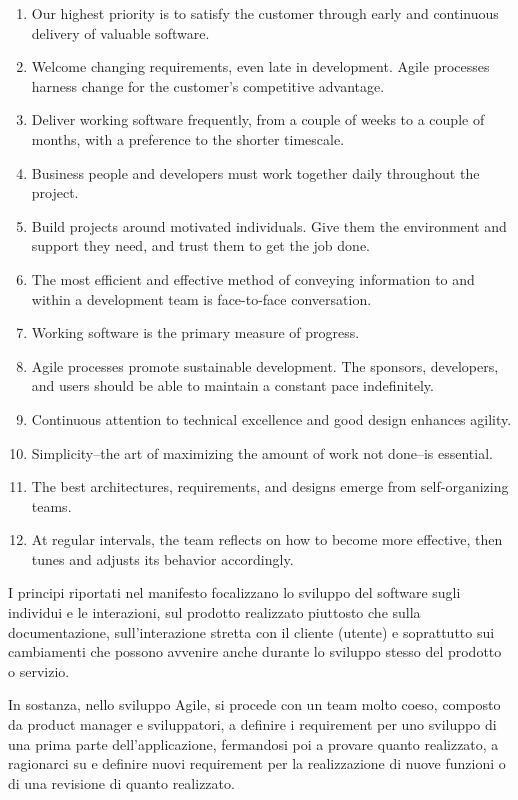 \begin{enumerate}
	\itemsep-0.3em
	\item Our highest priority is to satisfy the customer through early and continuous delivery of valuable software.
	\item Welcome changing requirements, even late in development. Agile processes harness change for the customer's competitive advantage.
	\item Deliver working software frequently, from a couple of weeks to a couple of months, with a preference to the shorter timescale.
	\item Business people and developers must work together daily throughout the project.
	\item Build projects around motivated individuals. Give them the environment and support they need, and trust them to get the job done.
	\item The most efficient and effective method of conveying information to and within a development team is face-to-face conversation.
	\item Working software is the primary measure of progress.
	\item Agile processes promote sustainable development. The sponsors, developers, and users should be able to maintain a constant pace indefinitely.
	\item Continuous attention to technical excellence and good design enhances agility.
	\item Simplicity--the art of maximizing the amount of work not done--is essential.
	\item The best architectures, requirements, and designs emerge from self-organizing teams.
	\item At regular intervals, the team reflects on how to become more effective, then tunes and adjusts its behavior accordingly.
\end{enumerate}


I principi riportati nel manifesto focalizzano lo sviluppo del software sugli individui e le interazioni, sul prodotto realizzato piuttosto che
sulla documentazione, sull’interazione stretta con il cliente (utente) e soprattutto sui cambiamenti che possono avvenire anche durante lo sviluppo
stesso del prodotto o servizio.

In sostanza, nello sviluppo Agile, si procede con un team molto coeso, composto da product manager e sviluppatori, a definire i requirement per uno
sviluppo di una prima parte dell’applicazione, fermandosi poi a provare quanto realizzato, a ragionarci su e definire nuovi requirement per la
realizzazione di nuove funzioni o di una revisione di quanto realizzato.

